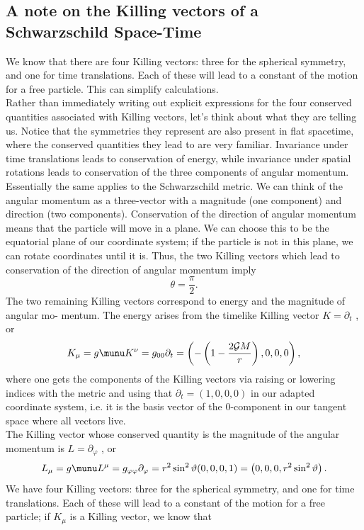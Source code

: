 \subsection{A note on the Killing vectors of a Schwarzschild Space-Time}
We know that there are four Killing vectors: three for the spherical
	symmetry, and one for time translations. Each of these will lead to a constant of the motion
	for a free particle. This can simplify calculations.\\
	Rather than immediately writing out explicit expressions for the four conserved quantities
	associated with Killing vectors, let’s think about what they are telling us. Notice that the
	symmetries they represent are also present in flat spacetime, where the conserved quantities
	they lead to are very familiar. Invariance under time translations leads to conservation of
	energy, while invariance under spatial rotations leads to conservation of the three components
	of angular momentum. Essentially the same applies to the Schwarzschild metric. We can
	think of the angular momentum as a three-vector with a magnitude (one component) and
	direction (two components). Conservation of the direction of angular momentum means
	that the particle will move in a plane. We can choose this to be the equatorial plane of
	our coordinate system; if the particle is not in this plane, we can rotate coordinates until
	it is. Thus, the two Killing vectors which lead to conservation of the direction of angular
	momentum imply
	\begin{equation}
		\theta = \frac{\pi}{2}.
	\end{equation}
	The two remaining Killing vectors correspond to energy and the magnitude of angular mo-
	mentum. The energy arises from the timelike Killing vector $K = ∂_t$ , or
	\begin{equation}
		K_\mu = g\munu K^\nu =g_{00} \partial_t= \left(-\left(1-\frac{2\mathcal{G}M}{r}\right),0,0,0\right),
	\end{equation}
	where one gets the components of the Killing vectors via raising or lowering indices with the metric and using that $\partial_t=(1,0,0,0)$ in our adapted coordinate system, i.e. it is the basis vector of the $0$-component in our tangent space where all vectors live.\\
	The Killing vector whose conserved quantity is the magnitude of the angular momentum is
	$L = ∂_φ$ , or
	\begin{equation}
	L_\mu= g\munu L^\mu = g_{\varphi \varphi} \partial_\varphi = r^2 \sin^2\vartheta (0,0,0,1) = \left(0,0,0,r^2 \sin^2 \vartheta\right).
	\end{equation}
We have four Killing vectors: three for the spherical
symmetry, and one for time translations. Each of these will lead to a constant of the motion
for a free particle; if $K_μ$ is a Killing vector, we know that
	
